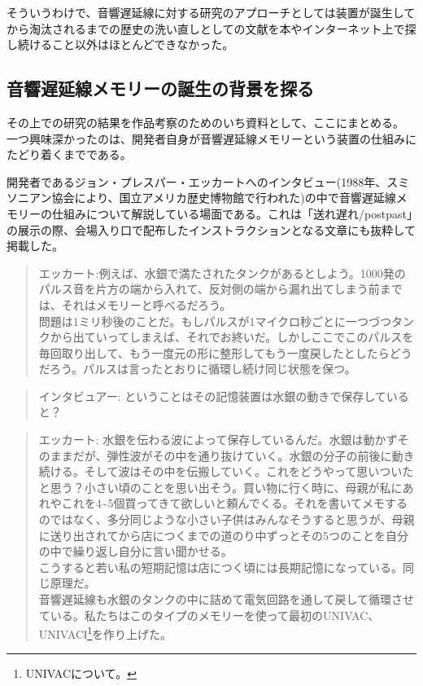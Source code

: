 \documentclass[a4paper,report]{jsbook}
\begin{document}
そういうわけで、音響遅延線に対する研究のアプローチとしては装置が誕生してから淘汰されるまでの歴史の洗い直しとしての文献を本やインターネット上で探し続けること以外はほとんどできなかった。

\subsection{音響遅延線メモリーの誕生の背景を探る}\label{ux97f3ux97ffux9045ux5ef6ux7ddaux30e1ux30e2ux30eaux30fcux306eux8a95ux751fux306eux80ccux666fux3092ux63a2ux308b}

その上での研究の結果を作品考察のためのいち資料として、ここにまとめる。\\
一つ興味深かったのは、開発者自身が音響遅延線メモリーという装置の仕組みにたどり着くまでである。

開発者であるジョン・プレスパー・エッカートへのインタビュー(1988年、スミソニアン協会により、国立アメリカ歴史博物館で行われた)の中で音響遅延線メモリーの仕組みについて解説している場面である。これは「送れ\textbar{}遅れ/post\textbar{}past」の展示の際、会場入り口で配布したインストラクションとなる文章にも抜粋して掲載した。

\begin{quote}
エッカート:例えば、水銀で満たされたタンクがあるとしよう。1000発のパルス音を片方の端から入れて、反対側の端から漏れ出てしまう前までは、それはメモリーと呼べるだろう。\\
問題は1ミリ秒後のことだ。もしパルスが1マイクロ秒ごとに一つづつタンクから出ていってしまえば、それでお終いだ。しかしここでこのパルスを毎回取り出して、もう一度元の形に整形してもう一度戻したとしたらどうだろう。パルスは言ったとおりに循環し続け同じ状態を保つ。
\end{quote}

\begin{quote}
インタビュアー: ということはその記憶装置は水銀の動きで保存していると？
\end{quote}

\begin{quote}
エッカート:
水銀を伝わる波によって保存しているんだ。水銀は動かずそのままだが、弾性波がその中を通り抜けていく。水銀の分子の前後に動き続ける。そして波はその中を伝搬していく。これをどうやって思いついたと思う？小さい頃のことを思い出そう。買い物に行く時に、母親が私にあれやこれを4\textasciitilde{}5個買ってきて欲しいと頼んでくる。それを書いてメモするのではなく、多分同じような小さい子供はみんなそうすると思うが、母親に送り出されてから店につくまでの道のり中ずっとその5つのことを自分の中で繰り返し自分に言い聞かせる。\\
こうすると若い私の短期記憶は店につく頃には長期記憶になっている。同じ原理だ。\\
音響遅延線も水銀のタンクの中に詰めて電気回路を通して戻して循環させている。私たちはこのタイプのメモリーを使って最初のUNIVAC、UNIVACⅠ\footnote{UNIVACについて。}を作り上げた。
\end{quote}
\end{document}
